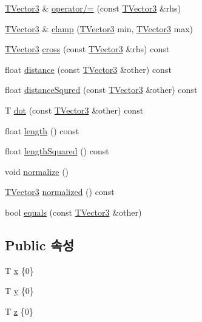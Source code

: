\begin{DoxyCompactItemize}
\item 
\hyperlink{classcpf_1_1_t_vector3}{T\+Vector3} \& \hyperlink{classcpf_1_1_t_vector3_a47de6d14092c37e5e9cedea2a78e1351}{operator/=} (const \hyperlink{classcpf_1_1_t_vector3}{T\+Vector3} \&rhs)
\item 
\hyperlink{classcpf_1_1_t_vector3}{T\+Vector3} \& \hyperlink{classcpf_1_1_t_vector3_a2d169126f33fea892d0c74df1aa7b777}{clamp} (\hyperlink{classcpf_1_1_t_vector3}{T\+Vector3} min, \hyperlink{classcpf_1_1_t_vector3}{T\+Vector3} max)
\item 
\hyperlink{classcpf_1_1_t_vector3}{T\+Vector3} \hyperlink{classcpf_1_1_t_vector3_ab8bf3f6455758ae7739a2a1f6ca8024c}{cross} (const \hyperlink{classcpf_1_1_t_vector3}{T\+Vector3} \&rhs) const
\item 
float \hyperlink{classcpf_1_1_t_vector3_a36faa29b2520d8db8c821f9c3eb9962b}{distance} (const \hyperlink{classcpf_1_1_t_vector3}{T\+Vector3} \&other) const
\item 
float \hyperlink{classcpf_1_1_t_vector3_a80b95c009f9a3910b6f379fc27d3afc4}{distance\+Squred} (const \hyperlink{classcpf_1_1_t_vector3}{T\+Vector3} \&other) const
\item 
T \hyperlink{classcpf_1_1_t_vector3_af9fe0a68a8cb923f6a35c2a7efce5a20}{dot} (const \hyperlink{classcpf_1_1_t_vector3}{T\+Vector3} \&other) const
\item 
float \hyperlink{classcpf_1_1_t_vector3_a3fa09a4a9ce8617239cbc2bbcc9858e0}{length} () const
\item 
float \hyperlink{classcpf_1_1_t_vector3_ad8e765a30a7fcf269dc129bc458a8e58}{length\+Squared} () const
\item 
void \hyperlink{classcpf_1_1_t_vector3_a06d8ed169a3e08e0c20498d97b9af248}{normalize} ()
\item 
\hyperlink{classcpf_1_1_t_vector3}{T\+Vector3} \hyperlink{classcpf_1_1_t_vector3_a85ded1a6a9844a51b0bb5fe803857a7e}{normalized} () const
\item 
bool \hyperlink{classcpf_1_1_t_vector3_a5d7d5c83ddd27c171249c21242da7889}{equals} (const \hyperlink{classcpf_1_1_t_vector3}{T\+Vector3} \&other)
\end{DoxyCompactItemize}
\subsection*{Public 속성}
\begin{DoxyCompactItemize}
\item 
T \hyperlink{classcpf_1_1_t_vector3_ad3df42808358a64c518d6349ede446d8}{x} \{0\}
\item 
T \hyperlink{classcpf_1_1_t_vector3_a2371a0583e76dcc80c6f10dd168cde1b}{y} \{0\}
\item 
T \hyperlink{classcpf_1_1_t_vector3_ae7ea5f4b24c3438a44eb6b0fdfe02823}{z} \{0\}
\end{DoxyCompactItemize}


